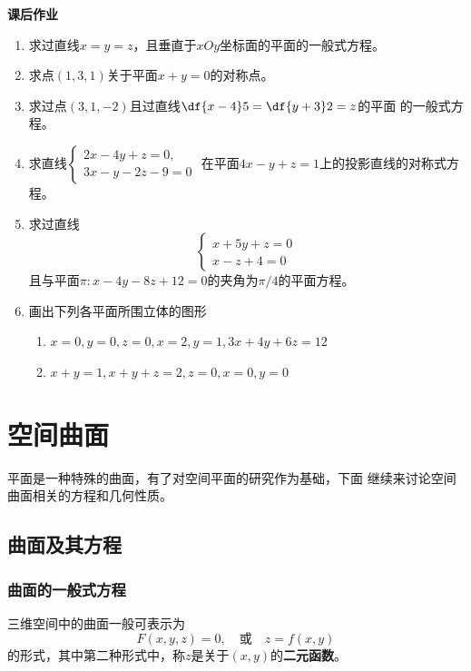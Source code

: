 \begin{ext}
	{\bf 课后作业}
	\begin{enumerate}
	  \item 求过直线$x=y=z$，且垂直于$xOy$坐标面的平面的一般式方程。
	  \item 求点$(1,3,1)$关于平面$x+y=0$的对称点。
	  \item 求过点$(3,1,-2)$且过直线$\df{x-4}5=\df{y+3}2=z$的平面
	  的一般式方程。
	  \item 求直线$\left\{\begin{array}{l}
	  	2x-4y+z=0, \\ 3x-y-2z-9=0
	  \end{array}\right.$
	  在平面$4x-y+z=1$上的投影直线的对称式方程。
	  \item 求过直线
		$$\left\{\begin{array}{l}
			x+5y+z=0\\
			x-z+4=0
		\end{array}\right.$$
		且与平面$\pi:x-4y-8z+12=0$的夹角为$\pi/4$的平面方程。
	  \item 画出下列各平面所围立体的图形
	  \begin{enumerate}[(1)]
	    \item $x=0,y=0,z=0,x=2,y=1,3x+4y+6z=12$
	    \item $x+y=1,x+y+z=2,z=0,x=0,y=0$
	  \end{enumerate}
	\end{enumerate}
\end{ext}

\section{空间曲面}

平面是一种特殊的曲面，有了对空间平面的研究作为基础，下面
继续来讨论空间曲面相关的方程和几何性质。

\subsection{曲面及其方程}

\subsubsection{曲面的一般式方程}

三维空间中的曲面一般可表示为
$$F(x,y,z)=0,\quad\mbox{或}\quad z=f(x,y)$$
的形式，其中第二种形式中，称$z$是关于$(x,y)$的{\bf 二元函数}。

% 

